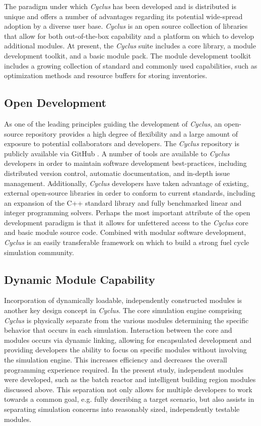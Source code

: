 \documentclass{anstrans}
\begin{document}
The paradigm under which \emph{Cyclus} has been developed and is
distributed is unique and offers a number of advantages regarding its
potential wide-spread adoption by a diverse user base. \emph{Cyclus}
is an open source collection of libraries that allow for both
out-of-the-box capability and a platform on which to develop
additional modules. At present, the \emph{Cyclus} suite includes a
core library, a module development toolkit, and a basic module pack.
The module development toolkit includes a growing collection of
standard and commonly used capabilities, such as optimization methods
and resource buffers for storing inventories.

\subsection{Open Development}
As one of the leading principles guiding the development of
\emph{Cyclus}, an open-source repository provides a high degree of
flexibility and a large amount of exposure to potential collaborators
and developers. The \emph{Cyclus} repository is publicly available via
GitHub \cite{cyclus2012}. A number of tools are available to
\emph{Cyclus} developers in order to maintain software development
best-practices, including distributed version control, automatic
documentation, and in-depth issue management. Additionally,
\emph{Cyclus} developers have taken advantage of existing, external
open-source libraries in order to conform to current standards,
including an expansion of the C++ standard library and fully
benchmarked linear and integer programming solvers. Perhaps the most
important attribute of the open development paradigm is that it allows
for unfettered access to the \emph{Cyclus} core and basic module
source code. Combined with modular software development, \emph{Cyclus}
is an easily transferable framework on which to build a strong fuel
cycle simulation community.

\subsection{Dynamic Module Capability}
Incorporation of dynamically loadable, independently constructed
modules is another key design concept in \emph{Cyclus}. The core
simulation engine comprising \emph{Cyclus} is physically separate from
the various modules determining the specific behavior that occurs in
each simulation.  Interaction between the core and modules occurs via
dynamic linking, allowing for encapsulated development and providing
developers the ability to focus on specific modules without involving
the simulation engine. This increases efficiency and decreases the
overall programming experience required. In the present study,
independent modules were developed, such as the batch reactor and
intelligent building region modules discussed above. This separation
not only allows for multiple developers to work towards a common goal,
e.g. fully describing a target scenario, but also assists in
separating simulation concerns into reasonably sized, independently
testable modules.
\end{document}
